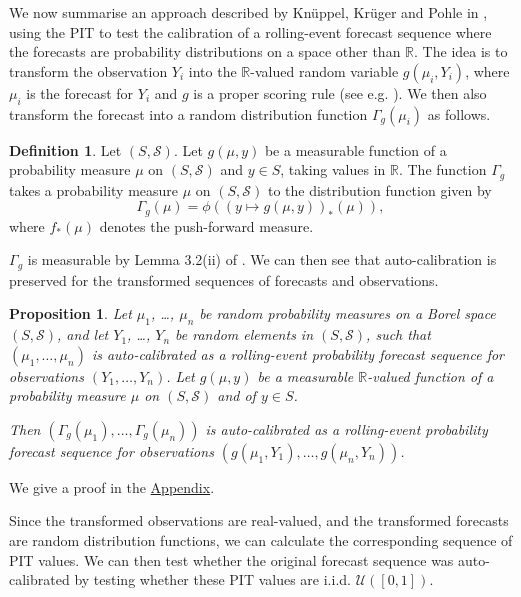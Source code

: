 \documentclass[aap]{imsart}
\theoremstyle{plain}
\newtheorem{proposition}[theorem]{Proposition}
\theoremstyle{definition}
\newtheorem{definition}[theorem]{Definition}
\begin{document}
We now summarise an approach described by Kn\"uppel, Kr\"uger and Pohle in \cite{Knp23}, using the PIT to test the calibration of a rolling-event forecast sequence where the forecasts are probability distributions on a space other than $\mathbb{R}$. The idea is to transform the observation $Y_i$ into the $\mathbb{R}$-valued random variable $g(\mu_i, Y_i)$, where $\mu_i$ is the forecast for $Y_i$ and $g$ is a proper scoring rule (see e.g. \cite{GRf07}). We then also transform the forecast into a random distribution function $\Gamma_g(\mu_i)$ as follows.

\begin{definition}
  Let $(S,\mathcal{S})$. Let $g(\mu,y)$ be a measurable function of a probability measure $\mu$ on $(S,\mathcal{S})$ and $y \in S$, taking values in $\mathbb{R}$. The function $\Gamma_g$ takes a probability measure $\mu$ on $(S,\mathcal{S})$ to the distribution function given by
\begin{equation*}
\Gamma_g(\mu) = \phi((y \mapsto g(\mu,y))_*(\mu)),
\end{equation*}
where $f_*(\mu)$ denotes the push-forward measure.
\end{definition}

$\Gamma_g$ is measurable by Lemma 3.2(ii) of \cite{Kll21}. We can then see that auto-calibration is preserved for the transformed sequences of forecasts and observations.

\begin{proposition}\label{transformation}
  Let $\mu_1$, \ldots, $\mu_n$ be random probability measures on a Borel space $(S,\mathcal{S})$, and let $Y_1$, \ldots, $Y_n$ be random elements in $(S,\mathcal{S})$, such that $(\mu_1, \ldots, \mu_n)$ is auto-calibrated as a rolling-event probability forecast sequence for observations $(Y_1, \ldots, Y_n)$. Let $g(\mu,y)$ be a measurable $\mathbb{R}$-valued function of a probability measure $\mu$ on $(S,\mathcal{S})$ and of $y \in S$.

  Then $(\Gamma_g(\mu_1), \ldots, \Gamma_g(\mu_n))$ is auto-calibrated as a rolling-event probability forecast sequence for observations $(g(\mu_1,Y_1), \ldots, g(\mu_n,Y_n))$.
\end{proposition}

We give a proof in the \hyperref[appn]{Appendix}.

Since the transformed observations are real-valued, and the transformed forecasts are random distribution functions, we can calculate the corresponding sequence of PIT values. We can then test whether the original forecast sequence was auto-calibrated by testing whether these PIT values are i.i.d. $\mathcal{U}([0,1])$.
\end{document}
